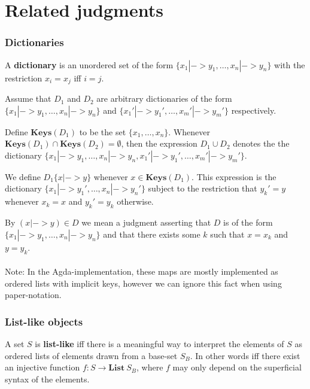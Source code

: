 \section{Related judgments}


\subsubsection{Dictionaries}
A \textbf{dictionary} is an unordered set of the form
$\{x_1 |-> y_1, \dots, x_n |-> y_n\}$ with the restriction $x_i = x_j$ iff
$i = j$.

Assume that $D_1$ and $D_2$ are arbitrary dictionaries of the form
$\{x_1 |-> y_1, \dots, x_n |-> y_n\}$ and
$\{x_1' |-> y_1', \dots, x_m' |-> y_m'\}$ respectively.

Define $\mathbf{Keys}(D_1)$ to be the set $\{x_1, \dots, x_n\}$. Whenever
$\mathbf{Keys}(D_1) \cap \mathbf{Keys}(D_2) = \emptyset$, then the expression
$D_1 \cup D_2$ denotes the the dictionary
$\{x_1 |-> y_1, \dots, x_n |-> y_n, x_1' |-> y_1', \dots, x_m' |-> y_m'\}$.

We define $D_1\{x |-> y\}$ whenever $x \in \mathbf{Keys}(D_1)$. This expression
is the dictionary $\{x_1 |-> y_1', \dots, x_n |-> y_n'\}$ subject to the
restriction that $y_k' = y$ whenever $x_k = x$ and $y_k' = y_k$ otherwise.

By $(x |-> y) \in D$ we mean a judgment asserting that $D$ is of the form
$\{x_1 |-> y_1, \dots, x_n |-> y_n\}$ and that there exists some $k$ such that
$x = x_k$ and $y = y_k$.

\paragraph{}
Note: In the Agda-implementation, these maps are mostly implemented as ordered
lists with implicit keys, however we can ignore this fact when using
paper-notation.

\subsubsection{List-like objects}
A set $S$ is \textbf{list-like} iff there is a meaningful way to interpret the
elements of $S$ as ordered lists of elements drawn from a base-set $S_B$. In
other words iff there exist an injective function
$f : S \to \mathbf{List}\ S_B$, where $f$ may only depend on the superficial
syntax of the elements.

